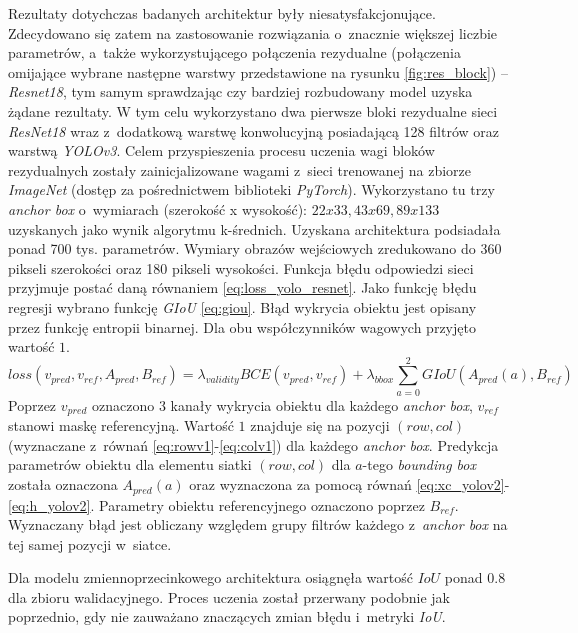 Rezultaty dotychczas badanych architektur były niesatysfakcjonujące.
Zdecydowano się zatem na zastosowanie rozwiązania o~znacznie większej liczbie parametrów, a~także wykorzystującego połączenia rezydualne (połączenia omijające wybrane następne warstwy przedstawione na rysunku \ref{fig:res_block}) -- \emph{Resnet18}\cite{resnet18}, tym samym sprawdzając czy bardziej rozbudowany model uzyska żądane rezultaty. 
W tym celu wykorzystano dwa pierwsze bloki rezydualne sieci \emph{ResNet18} wraz z~dodatkową warstwę konwolucyjną posiadającą 128 filtrów oraz warstwą \emph{YOLOv3}. 
Celem przyspieszenia procesu uczenia wagi bloków rezydualnych zostały zainicjalizowane wagami z~sieci trenowanej na zbiorze \emph{ImageNet}\cite{imagenet} (dostęp za pośrednictwem biblioteki \emph{PyTorch}).
Wykorzystano tu trzy \emph{anchor box} o~wymiarach (szerokość x wysokość): $22x33, 43x69, 89x133$ uzyskanych jako wynik algorytmu k-średnich. 
Uzyskana architektura podsiadała ponad 700 tys. parametrów.
Wymiary obrazów wejściowych zredukowano do 360 pikseli szerokości oraz 180 pikseli wysokości.
Funkcja błędu odpowiedzi sieci przyjmuje postać daną równaniem \eqref{eq:loss_yolo_resnet}.
Jako funkcję błędu regresji wybrano funkcję \emph{GIoU} \eqref{eq:giou}.
Błąd wykrycia obiektu jest opisany przez funkcję entropii binarnej.
Dla obu współczynników wagowych przyjęto wartość $1$.
\begin{equation}
loss(v_{pred},v_{ref},A_{pred}, B_{ref}) = \lambda_{validity} BCE(v_{pred}, v_{ref}) + \lambda_{bbox} \sum_{a = 0}^{2} GIoU(A_{pred}(a), B_{ref})
\label{eq:loss_yolo_resnet}
\end{equation}
Poprzez $v_{pred}$ oznaczono 3 kanały wykrycia obiektu dla każdego \emph{anchor box}, 
$v_{ref}$ stanowi maskę referencyjną.
Wartość $1$ znajduje się na pozycji $(row,col)$ (wyznaczane z~równań \eqref{eq:rowv1}-\eqref{eq:colv1}) dla każdego \emph{anchor box}.
Predykcja parametrów obiektu dla elementu siatki $(row,col)$ dla $a$-tego \emph{bounding box} została oznaczona $A_{pred}(a)$ oraz wyznaczona za pomocą równań \eqref{eq:xc_yolov2}-\eqref{eq:h_yolov2}.
Parametry obiektu referencyjnego oznaczono poprzez $B_{ref}$. 
Wyznaczany błąd jest obliczany względem grupy filtrów każdego z~\emph{anchor box} na tej samej pozycji w~siatce.


Dla modelu zmiennoprzecinkowego architektura osiągnęła wartość $IoU$ ponad $0.8$ dla zbioru walidacyjnego. Proces uczenia został przerwany podobnie jak poprzednio, gdy nie zauważano znaczących zmian błędu i~metryki \emph{IoU}.

